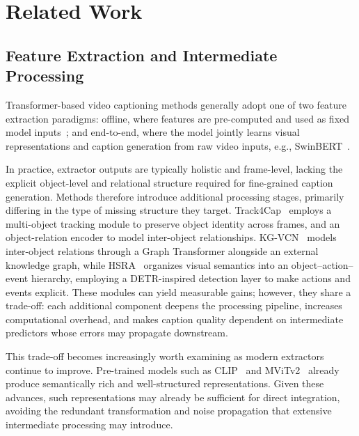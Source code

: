 \section{Related Work}
\label{sec:02_rw}

\subsection{Feature Extraction and Intermediate Processing}

Transformer-based video captioning methods generally adopt one of two feature extraction paradigms: offline, where features are pre-computed and used as fixed model inputs~\cite{yangConceptAwareVideoCaptioning2023, zhongBidirectionalTransformerKnowledge2024}; and end-to-end, where the model jointly learns visual representations and caption generation from raw video inputs, e.g., SwinBERT~\cite{linSwinBERTEndtoEndTransformers2022}.

In practice, extractor outputs are typically holistic and frame-level, lacking the explicit object-level and relational structure required for fine-grained caption generation. Methods therefore introduce additional processing stages, primarily differing in the type of missing structure they target. Track4Cap~\cite{luoFramebyFrameMultiObjectTrackingGuided2025} employs a multi-object tracking module to preserve object identity across frames, and an object-relation encoder to model inter-object relationships. KG-VCN~\cite{yuanFullyExploringObject2025} models inter-object relations through a Graph Transformer alongside an external knowledge graph, while HSRA~\cite{hanActionDrivenSemanticRepresentation2025} organizes visual semantics into an object–action–event hierarchy, employing a DETR-inspired detection layer to make actions and events explicit. These modules can yield measurable gains; however, they share a trade-off: each additional component deepens the processing pipeline, increases computational overhead, and makes caption quality dependent on intermediate predictors whose errors may propagate downstream.

This trade-off becomes increasingly worth examining as modern extractors continue to improve. Pre-trained models such as CLIP~\cite{radfordLearningTransferableVisual2021} and MViTv2~\cite{liMViTv2ImprovedMultiscale2022} already produce semantically rich and well-structured representations. Given these advances, such representations may already be sufficient for direct integration, avoiding the redundant transformation and noise propagation that extensive intermediate processing may introduce.


